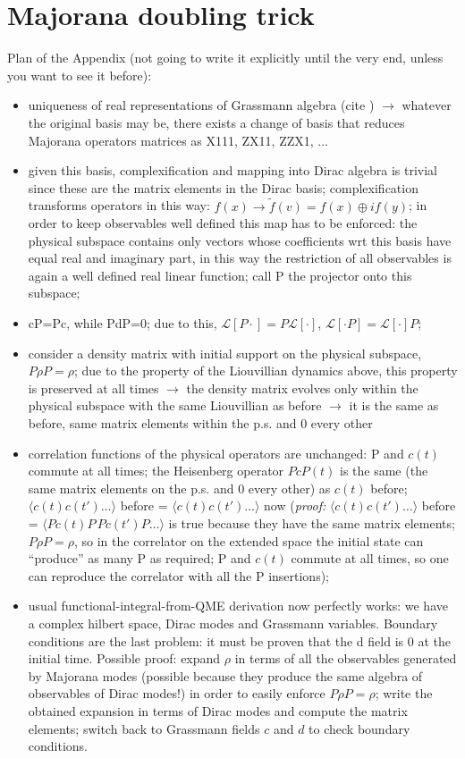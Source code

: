 \documentclass[a4paper,11pt]{article}
\theoremstyle{remark}
\newcommand{\mean}[1]{\ensuremath{\langle #1 \rangle}}
\newcommand{\ra}{\rightarrow}
\newcommand{\np}{\vskip 1.3cm}
\begin{document}
 \section{Majorana doubling trick}
 \label{sec:majorana_doubling_theory}
 Plan of the Appendix (not going to write it explicitly until the very end, unless you want to see it before):
 \begin{itemize}
  \item uniqueness of real representations of Grassmann algebra (cite \cite{Okubo1991real}) $\ra$ whatever the original basis may be, there exists a change of basis that reduces Majorana operators matrices as X111, ZX11, ZZX1, ...
  \item given this basis, complexification and mapping into Dirac algebra is trivial since these are the matrix elements in the Dirac basis; complexification transforms operators in this way: $f(x) \ra \tilde{f}(v)=f(x)\oplus if(y)$; in order to keep observables well defined this map has to be enforced: the physical subspace contains only vectors whose coefficients wrt this basis have equal real and imaginary part, in this way the restriction of all observables is again a well defined real linear function; call P the projector onto this subspace; 
  \item cP=Pc, while PdP=0; due to this, $\mathcal{L}[P\cdot]=P\mathcal{L}[\cdot]$, $\mathcal{L}[\cdot P]=\mathcal{L}[\cdot]P$;
  \item consider a density matrix with initial support on the physical subspace, $P\rho P = \rho$; due to the property of the Liouvillian dynamics above, this property is preserved at all times $\ra$ the density matrix evolves only within the physical subspace with the same Liouvillian as before $\ra$ it is the same as before, same matrix elements within the p.s. and 0 every other
  \item correlation functions of the physical operators are unchanged: P and $c(t)$ commute at all times; the Heisenberg operator $PcP(t)$ is the same (the same matrix elements on the p.s. and 0 every other) as $c(t)$ before; $\mean{c(t)c(t')\dots}$ before = $\mean{c(t) c(t')\dots}$ now (\textit{proof:} $\mean{c(t)c(t')\dots}$ before = $\mean{Pc(t)P\, Pc(t')P\dots}$ is true because they have the same matrix elements; $P\rho P = \rho$, so in the correlator on the extended space the initial state can ``produce'' as many P as required; P and $c(t)$ commute at all times, so one can reproduce the correlator with all the P insertions);
  \item usual functional-integral-from-QME derivation now perfectly works: we have a complex hilbert space, Dirac modes and Grassmann variables. Boundary conditions are the last problem: it must be proven that the d field is 0 at the initial time. Possible proof: expand $\rho$ in terms of all the observables generated by Majorana modes (possible because they produce the same algebra of observables of Dirac modes!) in order to easily enforce $P\rho P=\rho$; write the obtained expansion in terms of Dirac modes and compute the matrix elements; switch back to Grassmann fields $c$ and $d$ to check boundary conditions.
 \end{itemize}
 \np

   
   
{}
  
\end{document}
